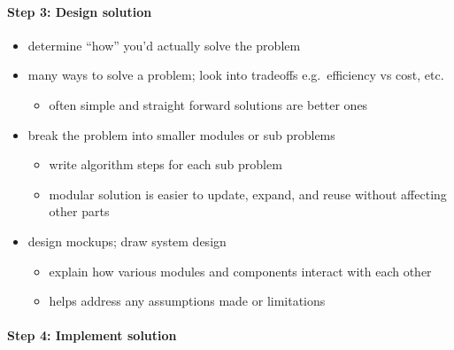\documentclass[11pt]{article}
\providecommand{\tightlist}{%
      \setlength{\itemsep}{0pt}\setlength{\parskip}{0pt}}
\begin{document}
\hypertarget{step-3-design-solution}{%
\paragraph{Step 3: Design solution}\label{step-3-design-solution}}

\begin{itemize}
\tightlist
\item
  determine ``how'' you'd actually solve the problem
\item
  many ways to solve a problem; look into tradeoffs e.g.~efficiency vs
  cost, etc.

  \begin{itemize}
  \tightlist
  \item
    often simple and straight forward solutions are better ones
  \end{itemize}
\item
  break the problem into smaller modules or sub problems

  \begin{itemize}
  \tightlist
  \item
    write algorithm steps for each sub problem
  \item
    modular solution is easier to update, expand, and reuse without
    affecting other parts
  \end{itemize}
\item
  design mockups; draw system design

  \begin{itemize}
  \tightlist
  \item
    explain how various modules and components interact with each other
  \item
    helps address any assumptions made or limitations
  \end{itemize}
\end{itemize}

\hypertarget{step-4-implement-solution}{%
\paragraph{Step 4: Implement solution}\label{step-4-implement-solution}}
\end{document}

